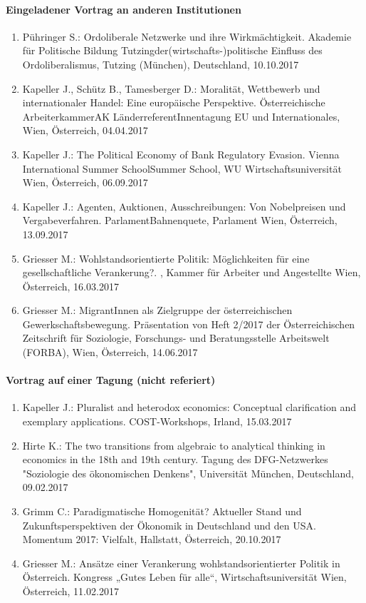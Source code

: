 \paragraph{Eingeladener Vortrag an anderen Institutionen}
\begin{enumerate}
	\item Pühringer S.: Ordoliberale Netzwerke und ihre Wirkmächtigkeit. Akademie für Politische Bildung Tutzingder(wirtschafts-)politische Einfluss des Ordoliberalismus, Tutzing (München), Deutschland, 10.10.2017
	\item Kapeller J., Schütz B., Tamesberger D.: Moralität, Wettbewerb und internationaler Handel: Eine europäische Perspektive. Österreichische ArbeiterkammerAK LänderreferentInnentagung EU und Internationales, Wien, Österreich, 04.04.2017
	\item Kapeller J.: The Political Economy of Bank Regulatory Evasion. Vienna International Summer SchoolSummer School, WU Wirtschaftsuniversität Wien, Österreich, 06.09.2017
	\item Kapeller J.: Agenten, Auktionen, Ausschreibungen: Von Nobelpreisen und Vergabeverfahren. ParlamentBahnenquete, Parlament Wien, Österreich, 13.09.2017
	\item Griesser M.: Wohlstandsorientierte Politik: Möglichkeiten für eine gesellschaftliche Verankerung?. , Kammer für Arbeiter und Angestellte Wien, Österreich, 16.03.2017
	\item Griesser M.: MigrantInnen als Zielgruppe der österreichischen Gewerkschaftsbewegung. Präsentation von Heft 2/2017 der Österreichischen Zeitschrift für Soziologie, Forschungs- und Beratungsstelle Arbeitswelt (FORBA), Wien, Österreich, 14.06.2017
\end{enumerate}
\paragraph{Vortrag auf einer Tagung (nicht referiert)}
\begin{enumerate}
	\item Kapeller J.: Pluralist and heterodox economics: Conceptual clarification and exemplary applications. COST-Workshops, Irland, 15.03.2017
	\item Hirte K.: The two transitions from algebraic to analytical thinking in economics in the 18th and 19th century. Tagung des DFG-Netzwerkes "Soziologie des ökonomischen Denkens", Universität München, Deutschland, 09.02.2017
	\item Grimm C.: Paradigmatische Homogenität? Aktueller Stand und  Zukunftsperspektiven der Ökonomik in Deutschland und den USA. Momentum 2017: Vielfalt, Hallstatt, Österreich, 20.10.2017
	\item Griesser M.: Ansätze einer Verankerung wohlstandsorientierter Politik in Österreich. Kongress „Gutes Leben für alle“, Wirtschaftsuniversität Wien, Österreich, 11.02.2017
\end{enumerate}
